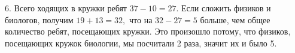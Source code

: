 6. Всего ходящих в кружки ребят $37-10=27.$ Если сложить физиков и биологов, получим $19+13=32,$ что на $32-27=5$ больше, чем общее количество ребят, посещающих кружки. Это произошло потому, что физиков, посещающих кружок биологии, мы посчитали 2 раза, значит их и было 5.\\
